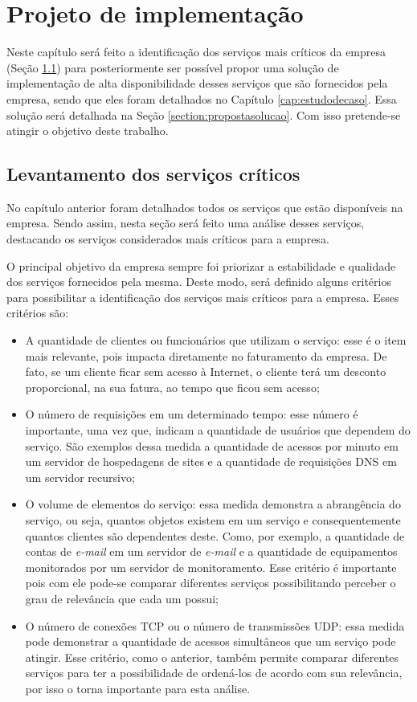 \chapter{Projeto de implementação}
\label{cap:projetoimplementacao}

Neste capítulo será feito a identificação dos serviços mais críticos da empresa (Seção \ref{section:servcrit}) para posteriormente ser possível 
propor uma solução de implementação de alta disponibilidade desses serviços que são fornecidos pela empresa, sendo que eles foram detalhados no 
Capítulo \ref{cap:estudodecaso}. Essa solução será detalhada na Seção \ref{section:propostasolucao}. Com isso pretende-se atingir o objetivo 
deste trabalho.

\section{Levantamento dos serviços críticos}
\label{section:servcrit}

No capítulo anterior foram detalhados todos os serviços que estão disponíveis na empresa. Sendo assim, nesta seção será feito uma análise desses
serviços, destacando os serviços considerados mais críticos para a empresa. 

O principal objetivo da empresa sempre foi priorizar a estabilidade e qualidade dos serviços fornecidos pela mesma. Deste modo, será definido 
alguns critérios para possibilitar a identificação dos serviços mais críticos para a empresa. Esses critérios são:
\begin{itemize}
 \item A quantidade de clientes ou funcionários que utilizam o serviço: esse é o item mais relevante, pois impacta diretamente no faturamento
 da empresa. De fato, se um cliente ficar sem acesso à Internet, o cliente terá um desconto proporcional, na sua fatura, ao tempo que ficou sem 
 acesso; 
 \item O número de requisições em um determinado tempo: esse número é importante, uma vez que, indicam a quantidade de usuários que dependem do 
 serviço. São exemplos dessa medida a quantidade de acessos por minuto em um servidor de hospedagens de sites e a quantidade de requisições 
 \ac{DNS} em um servidor recursivo;
 \item O volume de elementos do serviço: essa medida demonstra a abrangência do serviço, ou seja, quantos objetos existem em um serviço e 
 consequentemente quantos clientes são dependentes deste. Como, por exemplo, a quantidade de contas de \textit{e-mail} em um servidor de 
 \textit{e-mail} e a quantidade de equipamentos monitorados por um servidor de monitoramento. Esse critério é importante pois com ele pode-se
 comparar diferentes serviços possibilitando perceber o grau de relevância que cada um possui;
 \item O número de conexões \ac{TCP} ou o número de transmissões \ac{UDP}: essa medida pode demonstrar a quantidade de acessos simultâneos que um
 serviço pode atingir. Esse critério, como o anterior, também permite comparar diferentes serviços para ter a possibilidade de ordená-los de acordo 
 com sua relevância, por isso o torna importante para esta análise.
\end{itemize}

